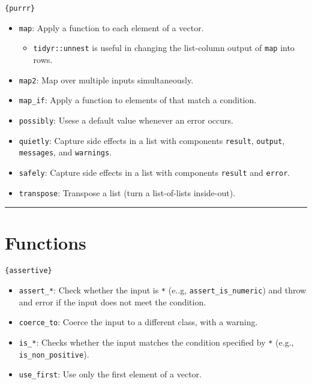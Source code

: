 \documentclass[]{book}
\providecommand{\tightlist}{%
  \setlength{\itemsep}{0pt}\setlength{\parskip}{0pt}}
\begin{document}
\texttt{\{purrr\}}

\begin{itemize}
\tightlist
\item
  \texttt{map}: Apply a function to each element of a vector.

  \begin{itemize}
  \tightlist
  \item
    \texttt{tidyr::unnest} is useful in changing the list-column output of \texttt{map} into rows.
  \end{itemize}
\item
  \texttt{map2}: Map over multiple inputs simultaneously.
\item
  \texttt{map\_if}: Apply a function to elements of that match a condition.
\item
  \texttt{possibly}: Usese a default value whenever an error occurs.
\item
  \texttt{quietly}: Capture side effects in a list with components \texttt{result}, \texttt{output}, \texttt{messages}, and \texttt{warnings}.
\item
  \texttt{safely}: Capture side effects in a list with components \texttt{result} and \texttt{error}.
\item
  \texttt{transpose}: Transpose a list (turn a list-of-lists inside-out).
\end{itemize}

\begin{center}\rule{0.5\linewidth}{\linethickness}\end{center}

\hypertarget{functions}{%
\section{Functions}\label{functions}}

\texttt{\{assertive\}}

\begin{itemize}
\tightlist
\item
  \texttt{assert\_*}: Check whether the input is \texttt{*} (e..g, \texttt{assert\_is\_numeric}) and throw and error if the input does not meet the condition.
\item
  \texttt{coerce\_to}: Coerce the input to a different class, with a warning.
\item
  \texttt{is\_*}: Checks whether the input matches the condition specified by \texttt{*} (e.g., \texttt{is\_non\_positive}).
\item
  \texttt{use\_first}: Use only the first element of a vector.
\end{itemize}
\end{document}
